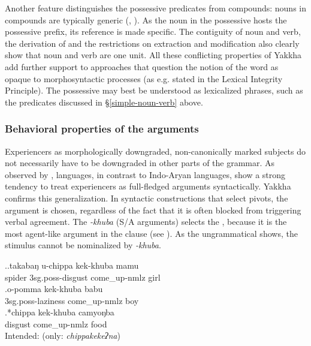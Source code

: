 Another feature distinguishes the possessive  predicates from compounds: nouns in compounds are typically generic (\citealt[66]{Fabb2001Compounding}, \citet[156]{Haspelmath2002Understanding}). As the noun in the possessive  hosts the possessive prefix, its reference is made specific. The contiguity of noun and verb, the derivation of  and the restrictions on extraction and modification also clearly show that noun and verb are one unit. All these conflicting properties of Yakkha add further support to approaches that question the notion of the word as opaque to morphosyntactic processes (as e.g. stated in the Lexical Integrity Principle). The possessive  may best be understood as lexicalized phrases, such as  the predicates discussed in §\ref{simple-noun-verb} above.  


\subsubsection{Behavioral properties of the  arguments}\label{poss-e4}

Experiencers as morphologically downgraded, non-canonically marked subjects do not necessarily have to be downgraded in other parts of the grammar. As observed  by \citet{Bickel2004The-syntax},  languages, in contrast to Indo-Aryan languages, show a strong tendency to treat  experiencers as full-fledged arguments  syntactically. Yakkha confirms this generalization. In syntactic constructions that select pivots, the  argument is chosen, regardless of the fact that  it is often blocked from triggering verbal agreement. The  \emph{-khuba} (S/A arguments) selects the , because it is the most agent-like argument in the clause (see \Next). As the ungrammatical \Next[c] shows, the stimulus cannot be nominalized by \emph{-khuba}.


 \ex.\ag.takabaŋ u-chippa kek-khuba mamu\\
spider {\sc 3sg.poss-}disgust come\_up{\sc -nmlz} girl\\
\bg.o-pomma kek-khuba babu\\
{\sc 3sg.poss-}laziness come\_up{\sc -nmlz} boy\\
\bg.*chippa kek-khuba camyoŋba \\
disgust come\_up{\sc -nmlz} food \\
Intended:  (only: \emph{chippakekeʔna})

